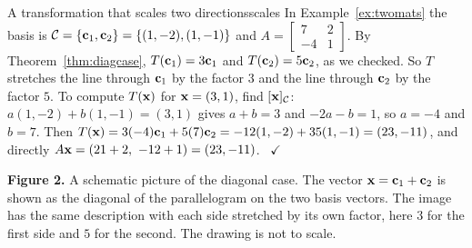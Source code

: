 \documentclass[11pt]{article}
\begin{document}
\begin{exmp}{A transformation that scales two directions}{scales}
In Example~\ref{ex:twomats} the basis is $\mathcal{C}=\{\mathbf{c}_1,\mathbf{c}_2\}=\{(1,-2),(1,-1)\}$ and $A=\begin{bmatrix}7&2\\-4&1\end{bmatrix}$. By Theorem~\ref{thm:diagcase}, $T(\mathbf{c}_1)=3\mathbf{c}_1$ and $T(\mathbf{c}_2)=5\mathbf{c}_2$, as we checked. So $T$ stretches the line through $\mathbf{c}_1$ by the factor $3$ and the line through $\mathbf{c}_2$ by the factor $5$. To compute $T(\mathbf{x})$ for $\mathbf{x}=(3,1)$, find $[\mathbf{x}]_{\mathcal{C}}$: $a(1,-2)+b(1,-1)=(3,1)$ gives $a+b=3$ and $-2a-b=1$, so $a=-4$ and $b=7$. Then $T(\mathbf{x})=3(-4)\mathbf{c}_1+5(7)\mathbf{c}_2=-12(1,-2)+35(1,-1)=(23,-11)$, and directly $A\bv{x}=(21+2,\ -12+1)=(23,-11)$. \ $\checkmark$
\end{exmp}

\begin{center}
\end{center}

\noindent\textbf{Figure 2.} A schematic picture of the diagonal case. The vector $\mathbf{x}=\mathbf{c}_1+\mathbf{c}_2$ is shown as the diagonal of the parallelogram on the two basis vectors. The image has the same description with each side stretched by its own factor, here $3$ for the first side and $5$ for the second. The drawing is not to scale.
\end{document}
